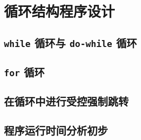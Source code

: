 
\section{循环结构程序设计}

\subsection{\lstinline{while} 循环与 \lstinline{do-while} 循环}

\subsection{\lstinline{for} 循环}

\subsection{在循环中进行受控强制跳转}

\subsection{程序运行时间分析初步}

\pagebreak